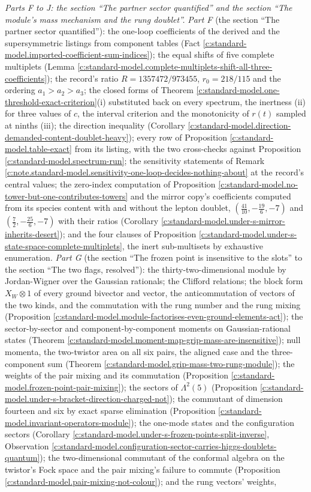 \documentclass[11pt]{article}
\theoremstyle{definition}
\theoremstyle{plain}
\begin{document}
\emph{Parts F to J: the section ``The partner sector quantified'' and the section ``The module's mass mechanism and the rung doublet''.} \emph{Part F} (the section ``The partner sector quantified''): the one-loop coefficients of the derived and the supersymmetric listings from component tables (Fact \ref{c:standard-model.imported-coefficient-sum-indices}); the equal shifts of five complete multiplets (Lemma \ref{c:standard-model.complete-multiplets-shift-all-three-coefficients}); the record's ratio $R = 1357472/973455$, $r_{0} = 218/115$ and the ordering $a_{1} > a_{2} > a_{3}$; the closed forms of Theorem \ref{c:standard-model.one-threshold-exact-criterion}(i) substituted back on every spectrum, the inertness (ii) for three values of $c$, the interval criterion and the monotonicity of $r(t)$ sampled at ninths (iii); the direction inequality (Corollary \ref{c:standard-model.direction-demanded-content-doublet-heavy}); every row of Proposition \ref{c:standard-model.table-exact} from its listing, with the two cross-checks against Proposition \ref{c:standard-model.spectrum-run}; the sensitivity statements of Remark \ref{c:note.standard-model.sensitivity-one-loop-decides-nothing-about} at the record's central values; the zero-index computation of Proposition \ref{c:standard-model.no-tower-but-one-contributes-towers} and the mirror copy's coefficients computed from its species content with and without the lepton doublet, $(\tfrac{41}{10}, -\tfrac{19}{6}, -7)$ and $(\tfrac72, -\tfrac{25}{6}, -7)$ with their ratios (Corollary \ref{c:standard-model.under-s-mirror-inherits-desert}); and the four clauses of Proposition \ref{c:standard-model.under-s-state-space-complete-multiplets}, the inert sub-multisets by exhaustive enumeration. \emph{Part G} (the section ``The frozen point is insensitive to the slots'' to the section ``The two flags, resolved''): the thirty-two-dimensional module by Jordan-Wigner over the Gaussian rationals; the Clifford relations; the block form $X_{W} \otimes 1$ of every ground bivector and vector, the anticommutation of vectors of the two kinds, and the commutation with the rung number and the rung mixing (Proposition \ref{c:standard-model.module-factorises-even-ground-elements-act}); the sector-by-sector and component-by-component moments on Gaussian-rational states (Theorem \ref{c:standard-model.moment-map-grip-mass-are-insensitive}); null momenta, the two-twistor area on all six pairs, the aligned case and the three-component sum (Theorem \ref{c:standard-model.grip-mass-two-rung-module}); the weights of the pair mixing and its commutation (Proposition \ref{c:standard-model.frozen-point-pair-mixing}); the sectors of $\Lambda^{2}(5)$ (Proposition \ref{c:standard-model.under-s-bracket-direction-charged-not}); the commutant of dimension fourteen and six by exact sparse elimination (Proposition \ref{c:standard-model.invariant-operators-module}); the one-mode states and the configuration sectors (Corollary \ref{c:standard-model.under-s-frozen-points-split-inverse}, Observation \ref{c:standard-model.configuration-sector-carries-higgs-doublets-quantum}); the two-dimensional commutant of the conformal algebra on the twistor's Fock space and the pair mixing's failure to commute (Proposition \ref{c:standard-model.pair-mixing-not-colour}); and the rung vectors' weights, 
\end{document}
